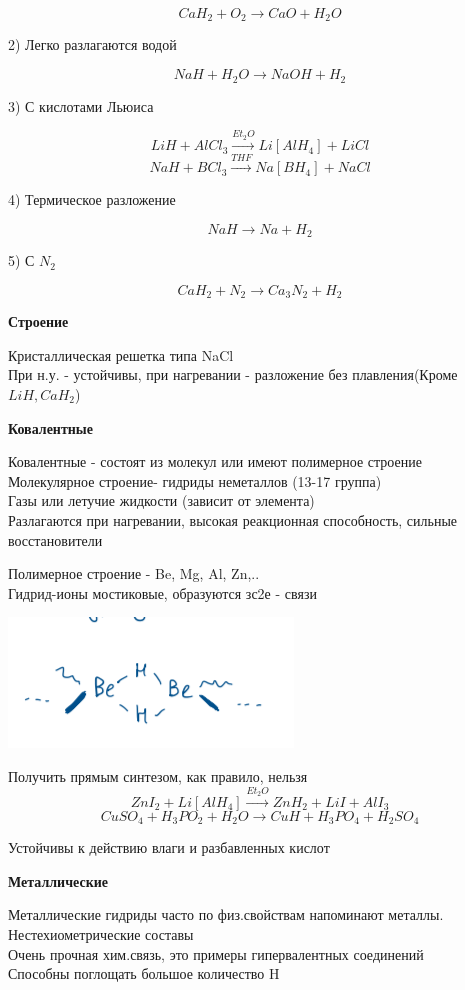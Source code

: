 $$CaH_2 + O_2 \rightarrow CaO + H_2O$$

2) Легко разлагаются водой

$$NaH + H_2O \rightarrow NaOH + H_2$$

3) С кислотами Льюиса

$$LiH + AlCl_3 \xrightarrow{Et_2O} Li[AlH_4] + LiCl$$
$$NaH + BCl_3 \xrightarrow{THF} Na[BH_4] + NaCl$$

4) Термическое разложение

$$NaH \rightarrow Na + H_2$$

5) С $N_2$

$$CaH_2 + N_2 \rightarrow Ca_3N_2 + H_2$$

\textbf{Строение}

Кристаллическая решетка типа NaCl\\
При н.у. - устойчивы, при нагревании - разложение без плавления(Кроме $LiH, CaH_2$)

\textbf{Ковалентные}

Ковалентные - состоят из молекул или имеют полимерное строение\\
Молекулярное строение- гидриды неметаллов (13-17 группа)\\
Газы или летучие жидкости (зависит от элемента)\\
Разлагаются при нагревании, высокая реакционная способность, сильные восстановители

Полимерное строение - Be, Mg, Al, Zn,..\\
Гидрид-ионы мостиковые, образуются зс2е - связи

\includegraphics{images/12v1.png}

Получить прямым синтезом, как правило, нельзя\\
$$ZnI_2 + Li[AlH_4] \xrightarrow{Et_2O} ZnH_2 + LiI + AlI_3$$
$$CuSO_4 + H_3PO_2 + H_2O \rightarrow CuH + H_3PO_4 + H_2SO_4$$

Устойчивы к действию влаги и разбавленных кислот


\textbf{Металлические}

Металлические гидриды часто по физ.свойствам напоминают металлы.\\
Нестехиометрические составы\\
Очень прочная хим.связь, это примеры гипервалентных соединений\\
Способны поглощать большое количество H

